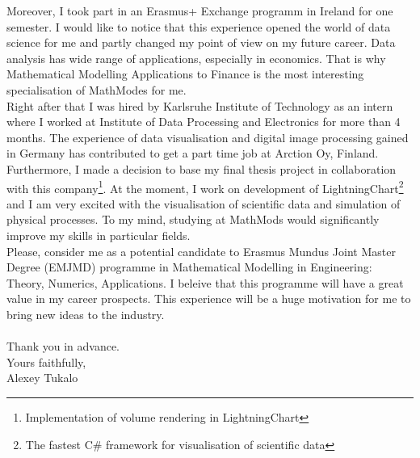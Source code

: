 \documentclass[english]{article}
\begin{document}
Moreover, I took part in an Erasmus+ Exchange programm in Ireland for one semester. I would like to notice that this experience opened the world of data science for me and partly changed my point of view on my future career. Data analysis has wide range of applications, especially in economics. That is why Mathematical Modelling Applications to Finance is the most interesting specialisation of MathModes for me.\\

Right after that I was hired by Karlsruhe Institute of Technology as an intern where I worked at Institute of Data Processing and Electronics for more than 4 months. The experience of data visualisation and digital image processing gained in Germany has contributed to get a part time job at Arction Oy, Finland. Furthermore, I made a decision to base my final thesis project in collaboration with this company\footnote{Implementation of volume rendering in LightningChart}. At the moment, I work on development of LightningChart\footnote{The fastest C\# framework for visualisation of scientific data} and I am very excited with the visualisation of scientific data and simulation of physical processes. To my mind, studying at MathMods would significantly improve my skills in particular fields.\\

Please, consider me as a potential candidate to Erasmus Mundus Joint Master Degree (EMJMD) programme in Mathematical Modelling in Engineering: Theory, Numerics, Applications. I beleive that this programme will have a great value in my career prospects. This experience will be a huge motivation for me to bring new ideas to the industry. \\\\


Thank you in advance.\\
Yours faithfully,\\
Alexey Tukalo
    
\end{document}
